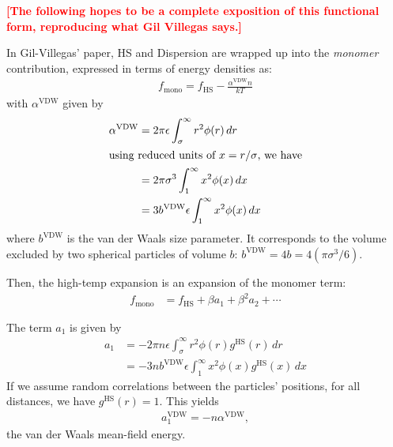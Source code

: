 \documentclass[letterpaper,twocolumn,amsmath,amssymb,pre,aps,10pt]{revtex4-1}
\newcommand\fixme[1]{\textcolor{red}{\textbf{[#1]}}}
\begin{document}
\fixme{The following hopes to be a complete exposition of this functional form,
  reproducing what Gil Villegas says.}

In Gil-Villegas' paper, HS and Dispersion are wrapped up into the
\textit{monomer} contribution, expressed in terms of energy densities
as:
\begin{align}
  f_\text{mono} = f_\text{HS} - \frac{\alpha^\text{VDW}n}{kT}
\end{align}
with $\alpha^\text{VDW}$ given by
\begin{align}
  \alpha^\text{VDW} &= 2\pi\epsilon\int_\sigma^\infty r^2\phi(r)\,dr \\
  \intertext{using reduced units of $x = r/\sigma$, we have}
  &= 2\pi\sigma^3\int_1^\infty x^2\phi(x)\,dx \\
  &= 3b^\text{VDW}\epsilon\int_1^\infty x^2\phi(x)\,dx
\end{align}
where $b^\text{VDW}$ is the van der Waals size parameter. It corresponds to the volume excluded by two spherical particles of volume $b$: $b^\text{VDW} = 4b = 4\left(\pi\sigma^3/6\right)$.

Then, the high-temp expansion is an expansion of the monomer term:
\begin{align}
  f_\text{mono} &= f_\text{HS} + \beta a_1 + \beta^2 a_2 + \cdots
\end{align}

The term $a_1$ is given by
\begin{align}
  a_1 &= -2\pi n \epsilon\int_\sigma^\infty r^2\phi(r)g^\text{HS}(r)\,dr \\
  &= -3 n  b^\text{VDW}\epsilon\int_1^\infty x^2\phi(x)g^\text{HS}(x)\,dx
\end{align}
If we assume random correlations between the particles' positions, for all distances, we have $g^\text{HS}(r) = 1$. This yields
\begin{align}
  a_1^\text{VDW} = - n \alpha^\text{VDW},
\end{align}
the van der Waals mean-field energy.
\end{document}
